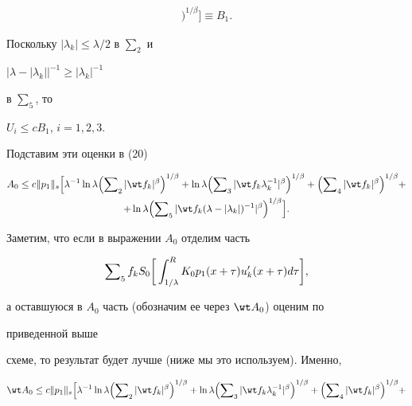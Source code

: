 {\begin{align*}
\Bigr)^{1/\beta}\biggr]\equiv B_1.


\end{align*}


Поскольку $|\lambda_k|\le\lambda/2$ в $\sum_2$ и 


$\bigl|\lambda-|\lambda_k|\bigr|^{-1}\ge|\lambda_k|^{-1}$


в $\sum_5$, то


$U_i\le c B_1$, $i=1,2,3$.


Подставим эти оценки в (20)


\begin{multline}


A_0\le c\|p_1\|_s\Bigl[\lambda^{-1}\ln\lambda\Bigl(


\sumn_2|\wt f_k|^\beta\Bigr)^{1/\beta}+\ln\lambda


\Bigl(\sumn_3|\wt f_k\lambda^{-1}_k|^\beta\Bigr)^{1/\beta}+


\Bigl(\sumn_4|\wt f_k|^\beta\Bigr)^{1/\beta}+ \\


+\ln\lambda\Bigl(\sumn_5|\wt f_k(\lambda-|\lambda_k|)^{-1}|^\beta


\Bigr)^{1/\beta}\Bigr].


\end{multline}





Заметим, что если в выражении $A_0$ отделим часть


\begin{equation}


\sumn_5 f_k S_0\biggl[\,


\int^R_{1/\lambda}K_0 p_1(x+\tau)u'_k(x+\tau)d\tau\biggr],


\end{equation}


а оставшуюся в $A_0$ часть (обозначим ее через $\wt A_0$) оценим по


приведенной выше


схеме, то результат будет лучше (ниже мы это используем). Именно,


\begin{multline}


\wt A_0\le c\|p_1\|_s\Bigl[\lambda^{-1}\ln\lambda\Bigl(


\sumn_2|\wt f_k|^\beta\Bigr)^{1/\beta}+\ln\lambda


\Bigl(\sumn_3|\wt f_k\lambda^{-1}_k|^\beta\Bigr)^{1/\beta}+


\Bigl(\sumn_4|\wt f_k|^\beta\Bigr)^{1/\beta}+ \\



\end{multline}}
